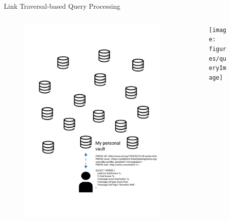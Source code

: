 \begin{frame}{Link Traversal-based Query Processing}
    \begin{columns}[T] %
        \begin{column}{.48\textwidth}
        
            \begin{figure}
                \centering
                \includegraphics[height = .80\textheight]{figures/queryWithLinkTraversal1}
            \end{figure}
        
        \end{column}%
        \hfill%
        \begin{column}{.48\textwidth}

            \begin{figure}
                \centering
                \texttt{[image: figures/queryImage]}
            \end{figure}

        \end{column}%
    \end{columns}
\end{frame}

